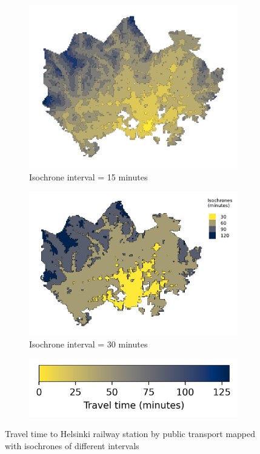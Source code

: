 \begin{figure}[H]
\begin{subfigure}[b]{0.5\textwidth}
		\includegraphics[width=\textwidth]{visual/figures/ttm/isochrone_interval_15}
		\caption{Isochrone interval = 15 minutes}
		\label{fig:interval 15}
	\end{subfigure}%
	\hfill
	\begin{subfigure}[b]{0.5\textwidth}
		\includegraphics[width=\textwidth]{visual/figures/ttm/isochrone_interval_30}
		\caption{Isochrone interval = 30 minutes}
		\label{fig:interval 30}
	\end{subfigure}%
	\hfill
	\begin{subfigure}[b]{0.4\textwidth}
		\includegraphics[width=\textwidth]{visual/figures/ttm/isochrone_cbar}
	\end{subfigure}%
	\caption{Travel time to Helsinki railway station by public transport mapped with isochrones of different intervals}
	\label{fig:isochrone intervals}
\end{figure}

